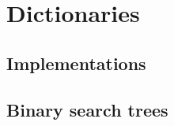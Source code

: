 \chapter{Dictionaries}
\label{chap:dictionaries}

\section{Implementations}

\section{Binary search trees}